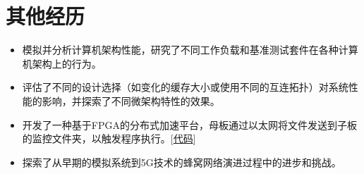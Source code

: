 \documentclass{resume}
\begin{document}
\section{其他经历}
\vspace{-8pt}
\begin{itemize}
    \item 模拟并分析计算机架构性能，研究了不同工作负载和基准测试套件在各种计算机架构上的行为。
    \item 评估了不同的设计选择（如变化的缓存大小或使用不同的互连拓扑）对系统性能的影响，并探索了不同微架构特性的效果。
\end{itemize}

\vspace{-8pt}
\begin{itemize}
    \item 开发了一种基于FPGA的分布式加速平台，母板通过以太网将文件发送到子板的监控文件夹，以触发程序执行。[\href{https://github.com/jingyao-zhang/XSC_Distributed_Platform_for_Acceleration}{代码}]
\end{itemize}

\vspace{-8pt}
\begin{itemize}
    \item 探索了从早期的模拟系统到5G技术的蜂窝网络演进过程中的进步和挑战。
\end{itemize}
\end{document}
